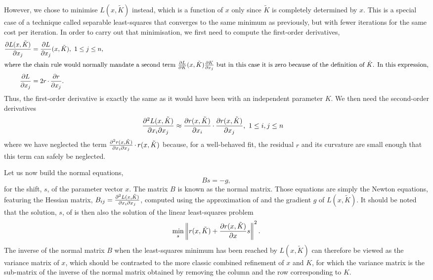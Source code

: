 \documentclass[pdf]{iucr}
\begin{document}
However, we chose to minimise $L(x, \tilde{K})$ instead, which is a function of $x$ only since $\tilde{K}$ is completely determined by $x$. This is a special case of a technique called separable least-squares \cite[and references therein]{Nielsen:2000fr} that  converges to the same minimum as previously, but with fewer iterations for the same cost per iteration. In order to carry out that minimisation, we first need to compute the first-order derivatives,
\begin{align}
\frac{\partial L(x, \tilde{K})}{\partial x_j} &= \frac{\partial L}{\partial x_j}(x, \tilde{K}),\ 1 \le j \le n, \\
\intertext{where the chain rule would normally mandate a second term $\frac{\partial L}{\partial K}(x, \tilde{K})\frac{\partial K}{\partial x_j}$ but in this case it is zero because of the definition of $\tilde{K}$. In this expression,}
\frac{\partial L}{\partial x_j} &= 2 r \operatorname{\cdot} \frac{\partial r}{\partial x_j}.
\end{align}
Thus, the first-order derivative is exactly the same as it would have been with an independent parameter $K$. We then need the second-order derivatives
\begin{align}
\frac{\partial^2 L(x, \tilde{K})}{\partial x_i \partial x_j} &\approx \frac{\partial r(x, \tilde{K})}{\partial x_i} \operatorname{\cdot} \frac{\partial r(x, \tilde{K})}{\partial x_j},\ 1 \le i,j \le n
\label{eqn:gaussleastsquares}
\end{align}
where we have neglected the term $\frac{\partial^2 r(x, \tilde{K})}{\partial x_i \partial x_j} \operatorname{\cdot} r(x, \tilde{K})$ because, for a well-behaved fit, the residual $r$ and its curvature are small enough that this term can safely be neglected.

Let us now build the normal equations, 
\begin{equation}
\label{eqn:gaussnewtoneq}
Bs = -g,
\end{equation}
for the shift, $s$, of the parameter vector $x$. The matrix $B$ is known as the normal matrix. Those equations are simply the Newton equations, featuring the Hessian matrix, $B_{ij} = \frac{\partial^2 L(x, \tilde{K})}{\partial x_i \partial x_j}$, computed using the approximation of  and the gradient $g$ of $L(x, \tilde{K})$. It should be noted that the solution, $s$, of  is then also the solution of the linear least-squares problem
\begin{equation}
\label{eqn:gaussnewtonaslinearls}
\min_s \left\| r(x, \tilde{K}) + \frac{\partial r(x, \tilde{K})}{\partial x} s \right\|^2.
\end{equation}
The inverse of the normal matrix $B$ when the least-squares minimum has been reached by $L(x, \tilde{K})$ can therefore be viewed as the variance matrix of $x$, which should be contrasted to the more classic combined refinement of $x$ and $K$, for which the variance matrix is the sub-matrix of the inverse of the normal matrix obtained by removing the column and the row corresponding to $K$. 
\end{document}
